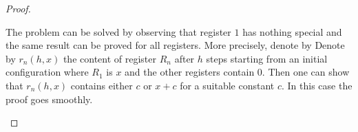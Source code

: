 \begin{exercise}
\begin{proof}
\begin{itemize}
  \medskip The problem can be solved by observing that register $1$
  has nothing special and the same result can be proved for all
  registers. More precisely, denote by Denote by $r_n(h,x)$ the
  content of register $R_n$ after $h$ steps starting from an initial
  configuration where $R_1$ is $x$ and the other registers contain
  $0$. Then one can show that $r_n(h,x)$ contains either $c$ or $x+c$
  for a suitable constant $c$. In this case the proof goes smoothly.
\end{itemize}
\end{proof}
\end{exercise}
